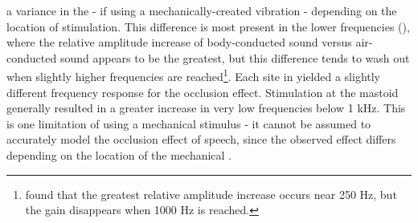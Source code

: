 \DIFdelbegin {}\DIFdelend \DIFaddbegin {}\DIFaddend a variance in the \DIFdelbegin {}\DIFdelend \DIFaddbegin {}\DIFaddend - if using a mechanically-created vibration - depending on the location of \DIFaddbegin {}\DIFaddend stimulation.  This difference is most present in the lower frequencies (\cite{dean:00}), where the relative amplitude increase of body-conducted sound versus air-conducted sound appears to be the greatest, but this difference tends to wash out when slightly higher frequencies are reached\footnote{\cite{dean:00} found that the greatest relative amplitude increase occurs near 250 Hz, but the gain disappears when 1000 Hz is reached.}.  Each \DIFaddbegin {}\DIFaddend site in \cite{stenfelt:07} \DIFdelbegin {}\DIFdelend yielded a slightly different frequency response for the occlusion effect.  Stimulation at the mastoid generally resulted in a greater increase in very low frequencies below 1 kHz.  This is one limitation of using a mechanical stimulus - it cannot be assumed to accurately model the occlusion effect of speech, since the observed effect differs depending on the location of the mechanical \DIFdelbegin {}\DIFdelend \DIFaddbegin {}\DIFaddend .


